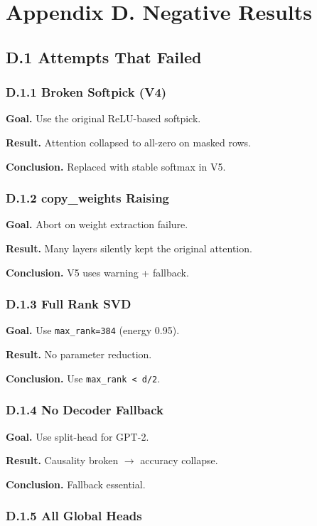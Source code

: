 \section{Appendix D. Negative Results}

\subsection{D.1 Attempts That Failed}

\subsubsection{D.1.1 Broken Softpick (V4)}

\textbf{Goal.} Use the original ReLU-based softpick.

\textbf{Result.} Attention collapsed to all-zero on masked rows.

\textbf{Conclusion.} Replaced with stable softmax in V5.

\subsubsection{D.1.2 copy\_weights Raising}

\textbf{Goal.} Abort on weight extraction failure.

\textbf{Result.} Many layers silently kept the original attention.

\textbf{Conclusion.} V5 uses warning + fallback.

\subsubsection{D.1.3 Full Rank SVD}

\textbf{Goal.} Use \texttt{max\_rank=384} (energy 0.95).

\textbf{Result.} No parameter reduction.

\textbf{Conclusion.} Use \texttt{max\_rank \textless{} d/2}.

\subsubsection{D.1.4 No Decoder Fallback}

\textbf{Goal.} Use split-head for GPT-2.

\textbf{Result.} Causality broken $\to$ accuracy collapse.

\textbf{Conclusion.} Fallback essential.

\subsubsection{D.1.5 All Global Heads}

